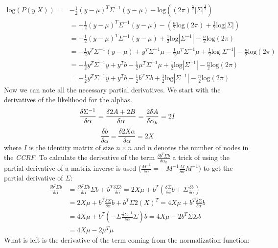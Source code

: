 \begin{equation}
\begin{split}
\text{log}(P(y|X)) = & -\frac{1}{2}(y-\mu)^T \Sigma^{-1} (y-\mu) - \text{log}((2\pi)^{\frac{n}{2}}|\Sigma | ^{\frac{1}{2}}) \\
& = -\frac{1}{2}(y-\mu)^T \Sigma^{-1} (y-\mu) -  (\frac{n}{2}\text{log}(2\pi) + \frac{1}{2}\text{log} | \Sigma | ) \\
& = -\frac{1}{2}(y-\mu)^T \Sigma^{-1} (y-\mu) + \frac{1}{2}\text{log} |\Sigma^{-1}| -\frac{n}{2}\text{log} (2\pi) \\
& = -\frac{1}{2}y^T \Sigma^{-1} (y-\mu) + y^T \Sigma^{-1} \mu - \frac{1}{2} \mu^T \Sigma^{-1} \mu +\frac{1}{2}\text{log} | \Sigma^{-1} | - \frac{n}{2}\text{log}(2\pi)\\
& = -\frac{1}{2} y^T \Sigma^{-1} y + y^T b - \frac{1}{2}\mu^T \Sigma^{-1} \mu + \frac{1}{2}\text{log} |\Sigma^{-1}| - \frac{n}{2}\text{log}(2\pi)\\
& = -\frac{1}{2} y^T \Sigma^{-1} y + y^T b - \frac{1}{2}b^T \Sigma b +\frac{1}{2}\text{log} |\Sigma^{-1}| -\frac{n}{2}\text{log}(2\pi)
\end{split}
\end{equation}
Now we can note all the necessary partial derivatives. We start with the derivatives of the likelihood for the alphas.
\begin{equation}
\frac{\delta \Sigma^{-1}}{\delta \alpha} = \frac{\delta 2A + 2B}{\delta \alpha} = \frac{2\delta A}{\delta \alpha_k} = 2I \\
\end{equation}
\begin{equation}
\frac{\delta b}{\delta \alpha} = \frac{\delta 2 X \alpha}{\delta \alpha} = 2X
\end{equation}
where $I$ is the identity matrix of size $n\times n$ and $n$ denotes the number of nodes in the \textit{CCRF}. 
To calculate the derivative of the term $\frac{\delta b^T \Sigma b}{\delta \alpha_k}$ a trick of using the partial derivative of a matrix inverse is used ($\frac{M^{-1}}{\delta \alpha} = -M^{-1}\frac{M}{\delta \alpha}M^{-1}$) to get the partial derivative of $\Sigma$:
\begin{equation}
\begin{split}
\frac{\delta b^T \Sigma b }{\delta \alpha} & = \frac{\delta b^T \Sigma b}{\delta \alpha } \Sigma b + b^T \frac{\delta \Sigma b}{\delta \alpha } = 2X\mu +b^T (\frac{\delta \Sigma }{\delta \alpha} b + \Sigma \frac{\delta b}{\delta \alpha}) \\
& = 2X \mu + b^T \frac{\delta \Sigma}{\delta \alpha} b + b^T \Sigma 2(X)^T = 4 X \mu + b^T \frac{\delta \Sigma }{\delta \alpha} b \\
& = 4X\mu + b^T (-\Sigma \frac{\delta \Sigma^{-1}}{\delta \alpha} \Sigma)b = 4X \mu -2b^T\Sigma \Sigma b \\
& = 4X \mu - 2\mu^T \mu
\end{split}
\end{equation}
 What is left is the derivative of the term coming from the normalization function:
 
